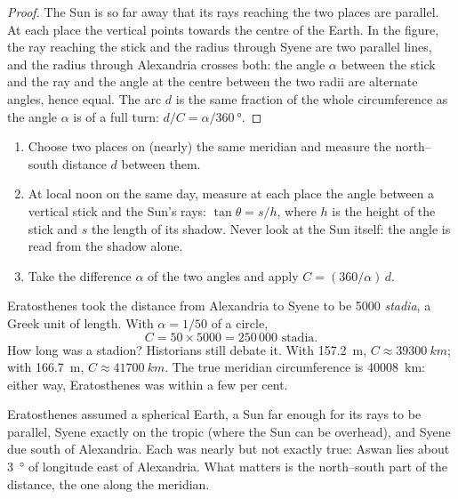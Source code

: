 \begin{proof}
The Sun is so far away that its rays reaching the two places are parallel.
At each place the vertical points towards the centre of the Earth. In the
figure, the ray reaching the stick and the radius through Syene are two
parallel lines, and the radius through Alexandria crosses both: the angle
$\alpha$ between the stick and the ray and the angle at the centre between
the two radii are alternate angles, hence equal. The arc $d$ is the same
fraction of the whole circumference as the angle $\alpha$ is of a full
turn: $d/C = \alpha/\qty{360}{\degree}$.
\end{proof}

\begin{method}\label{met:g10:measuring-the-earth:shadows}
\begin{enumerate}
  \item Choose two places on (nearly) the same meridian and measure the
        north--south distance $d$ between them.
  \item At local noon on the same day, measure at each place the angle
        between a vertical stick and the Sun's rays: $\tan \theta = s/h$,
        where $h$ is the height of the stick and $s$ the length of its
        shadow. Never look at the Sun itself: the angle is read from the
        shadow alone.
  \item Take the difference $\alpha$ of the two angles and apply
        $C = (360/\alpha)\,d$.
\end{enumerate}
\end{method}

\begin{example}\label{ex:g10:measuring-the-earth:numbers}
Eratosthenes took the distance from Alexandria to Syene to be 5000
\emph{stadia}, a Greek unit of length. With $\alpha = 1/50$ of a circle,
\[
  C = 50 \times 5000 = 250\,000 \text{ stadia}.
\]
How long was a stadion? Historians still debate it. With
\qty{157.2}{m}, $C \approx \qty{39300}{km}$; with \qty{166.7}{m},
$C \approx \qty{41700}{km}$. The true meridian circumference is
\qty{40008}{km}: either way, Eratosthenes was within a few per cent.
\end{example}

\begin{remark}\label{rem:g10:measuring-the-earth:assumptions}
Eratosthenes assumed a spherical Earth, a Sun far enough for its rays to be
parallel, Syene exactly on the tropic (where the Sun can be overhead), and
Syene due south of Alexandria. Each was nearly but not exactly true: Aswan
lies about \qty{3}{\degree} of longitude east of Alexandria. What matters is
the north--south part of the distance, the one along the meridian.
\end{remark}

